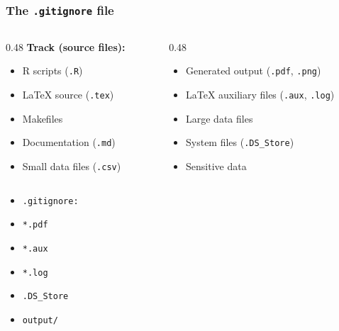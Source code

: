 \begin{frame}
\frametitle{The \texttt{.gitignore} file}
\centering

\vspace{5pt}

\begin{columns}[T]
\begin{column}{0.48\textwidth}
{\footnotesize \textbf{\textcolor{accent}{Track (source files):}}}

{\footnotesize
\begin{itemize}
\item R scripts (\texttt{.R})
\item \LaTeX{} source (\texttt{.tex})
\item Makefiles
\item Documentation (\texttt{.md})
\item Small data files (\texttt{.csv})
\end{itemize}
}
\end{column}
\begin{column}{0.48\textwidth}
{\footnotesize \textbf{}}

{\footnotesize
\begin{itemize}
\item Generated output (\texttt{.pdf}, \texttt{.png})
\item \LaTeX{} auxiliary files (\texttt{.aux}, \texttt{.log})
\item Large data files
\item System files (\texttt{.DS\_Store})
\item Sensitive data
\end{itemize}
}
\end{column}
\end{columns}

\vspace{12pt}

{\footnotesize
\begin{itemize}
\item[] \texttt{.gitignore:}
\item[] \texttt{*.pdf}
\item[] \texttt{*.aux}
\item[] \texttt{*.log}
\item[] \texttt{.DS\_Store}
\item[] \texttt{output/}
\end{itemize}
}

\end{frame}
